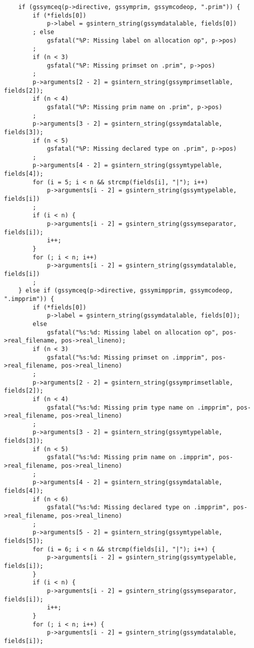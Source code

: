 \documentclass{report}
\begin{document}
\begin{verbatim}
    if (gssymceq(p->directive, gssymprim, gssymcodeop, ".prim")) {
        if (*fields[0])
            p->label = gsintern_string(gssymdatalable, fields[0])
        ; else
            gsfatal("%P: Missing label on allocation op", p->pos)
        ;
        if (n < 3)
            gsfatal("%P: Missing primset on .prim", p->pos)
        ;
        p->arguments[2 - 2] = gsintern_string(gssymprimsetlable, fields[2]);
        if (n < 4)
            gsfatal("%P: Missing prim name on .prim", p->pos)
        ;
        p->arguments[3 - 2] = gsintern_string(gssymdatalable, fields[3]);
        if (n < 5)
            gsfatal("%P: Missing declared type on .prim", p->pos)
        ;
        p->arguments[4 - 2] = gsintern_string(gssymtypelable, fields[4]);
        for (i = 5; i < n && strcmp(fields[i], "|"); i++)
            p->arguments[i - 2] = gsintern_string(gssymtypelable, fields[i])
        ;
        if (i < n) {
            p->arguments[i - 2] = gsintern_string(gssymseparator, fields[i]);
            i++;
        }
        for (; i < n; i++)
            p->arguments[i - 2] = gsintern_string(gssymdatalable, fields[i])
        ;
    } else if (gssymceq(p->directive, gssymimpprim, gssymcodeop, ".impprim")) {
        if (*fields[0])
            p->label = gsintern_string(gssymdatalable, fields[0]);
        else
            gsfatal("%s:%d: Missing label on allocation op", pos->real_filename, pos->real_lineno);
        if (n < 3)
            gsfatal("%s:%d: Missing primset on .impprim", pos->real_filename, pos->real_lineno)
        ;
        p->arguments[2 - 2] = gsintern_string(gssymprimsetlable, fields[2]);
        if (n < 4)
            gsfatal("%s:%d: Missing prim type name on .impprim", pos->real_filename, pos->real_lineno)
        ;
        p->arguments[3 - 2] = gsintern_string(gssymtypelable, fields[3]);
        if (n < 5)
            gsfatal("%s:%d: Missing prim name on .impprim", pos->real_filename, pos->real_lineno)
        ;
        p->arguments[4 - 2] = gsintern_string(gssymdatalable, fields[4]);
        if (n < 6)
            gsfatal("%s:%d: Missing declared type on .impprim", pos->real_filename, pos->real_lineno)
        ;
        p->arguments[5 - 2] = gsintern_string(gssymtypelable, fields[5]);
        for (i = 6; i < n && strcmp(fields[i], "|"); i++) {
            p->arguments[i - 2] = gsintern_string(gssymtypelable, fields[i]);
        }
        if (i < n) {
            p->arguments[i - 2] = gsintern_string(gssymseparator, fields[i]);
            i++;
        }
        for (; i < n; i++) {
            p->arguments[i - 2] = gsintern_string(gssymdatalable, fields[i]);

\end{verbatim}
\end{document}
